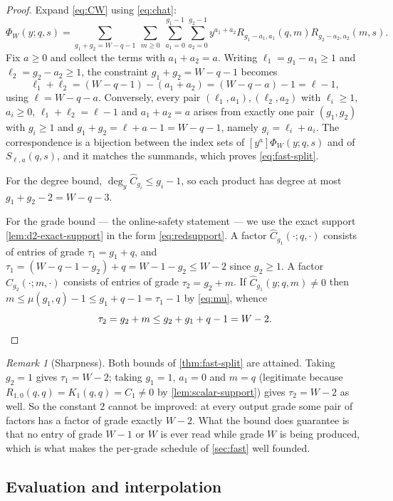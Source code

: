 \documentclass[11pt,reqno]{amsart}
\theoremstyle{definition}
\theoremstyle{remark}
\newtheorem{remark}[theorem]{Remark}
\newcommand{\Chat}{\widehat C}
\begin{document}
\begin{proof}
Expand \eqref{eq:CW} using \eqref{eq:chat}:
\[
 \Phi_W(y;q,s)=\sum_{g_1+g_2=W-q-1}\ \sum_{m\geq0}\
 \sum_{a_1=0}^{g_1-1}\sum_{a_2=0}^{g_2-1}
 y^{a_1+a_2}R_{g_1-a_1,a_1}(q,m)R_{g_2-a_2,a_2}(m,s).
\]
Fix $a\geq0$ and collect the terms with $a_1+a_2=a$.  Writing
$\ell_1=g_1-a_1\geq1$ and $\ell_2=g_2-a_2\geq1$, the constraint
$g_1+g_2=W-q-1$ becomes
\[
 \ell_1+\ell_2=(W-q-1)-(a_1+a_2)=(W-q-a)-1=\ell-1 ,
\]
using $\ell=W-q-a$.  Conversely, every pair $(\ell_1,a_1),(\ell_2,a_2)$ with
$\ell_i\geq1$, $a_i\geq0$, $\ell_1+\ell_2=\ell-1$ and $a_1+a_2=a$ arises
from exactly one pair $(g_1,g_2)$ with $g_i\geq1$ and $g_1+g_2=\ell+a-1
=W-q-1$, namely $g_i=\ell_i+a_i$.  The correspondence is a bijection between
the index sets of $[y^a]\Phi_W(y;q,s)$ and of $S_{\ell,a}(q,s)$, and it matches
the summands, which proves \eqref{eq:fast-split}.

For the degree bound, $\deg_y\Chat_{g_i}\leq g_i-1$, so each product has
degree at most $g_1+g_2-2=W-q-3$.

For the grade bound --- the online-safety statement --- we use the exact
support \cref{lem:d2-exact-support} in the form \eqref{eq:redsupport}.  A
factor $\Chat_{g_1}(\cdot;q,\cdot)$ consists of
entries of grade $\tau_1=g_1+q$, and $\tau_1=(W-q-1-g_2)+q=W-1-g_2\leq W-2$
since $g_2\geq1$.  A factor $\Chat_{g_2}(\cdot;m,\cdot)$ consists of entries
of grade $\tau_2=g_2+m$.  If $\Chat_{g_1}(y;q,m)\ne0$ then
$m\leq\mu(g_1,q)-1\leq g_1+q-1=\tau_1-1$ by \eqref{eq:mu}, whence
\[
 \tau_2=g_2+m\leq g_2+g_1+q-1=W-2 . \qedhere
\]
\end{proof}

\begin{remark}[Sharpness]\label{rem:readiness-tight}
Both bounds of \cref{thm:fast-split} are attained.  Taking $g_2=1$ gives
$\tau_1=W-2$; taking $g_1=1$, $a_1=0$ and $m=q$ (legitimate because
$R_{1,0}(q,q)=K_1(q,q)=C_1\ne0$ by
\cref{lem:scalar-support}) gives $\tau_2=W-2$ as well.  So the constant $2$
cannot be improved: at every output grade some pair of factors has a factor
of grade exactly $W-2$.  What the bound does guarantee is that no entry of
grade $W-1$ or $W$ is ever read while grade $W$ is being produced, which is
what makes the per-grade schedule of \cref{sec:fast} well founded.
\end{remark}

\subsection{Evaluation and interpolation}
\end{document}
